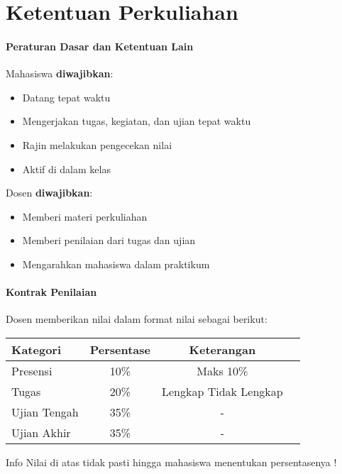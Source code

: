 

\section{Ketentuan Perkuliahan}
\begin{frame}{\insertsectionhead}
	\framesubtitle{Peraturan Dasar dan Ketentuan Lain}
	\justifying
	Mahasiswa \textbf{diwajibkan}:
	\begin{itemize}
		\item Datang tepat waktu
		\item Mengerjakan tugas, kegiatan, dan ujian tepat waktu
		\item Rajin melakukan pengecekan nilai
		\item Aktif di dalam kelas
	\end{itemize}
	Dosen \textbf{diwajibkan}:
	\begin{itemize}
		\item Memberi materi perkuliahan
		\item Memberi penilaian dari tugas dan ujian
		\item Mengarahkan mahasiswa dalam praktikum
	\end{itemize}
\end{frame}

\begin{frame}{\insertsectionhead}
	\framesubtitle{Kontrak Penilaian}
	\justifying
	Dosen memberikan nilai dalam format nilai sebagai berikut:
	 \begin{table}[H]
	 \centering
	 \begin{tabular}{@{} lccc @{}}
		    \toprule
		   \textbf{Kategori} & \textbf{Persentase} & \textbf{Keterangan} \\
		    \midrule
		    Presensi  & 10\% & Maks 10\% \\
		    Tugas  & 20\% & Lengkap \> Tidak Lengkap \\
		    Ujian Tengah   & 35\% & - \\
		    Ujian Akhir   & 35\% & - \\
		    \bottomrule
		  \end{tabular}
	\end{table}
	\begin{block}{Info}
		Nilai di atas tidak pasti hingga mahasiswa menentukan persentasenya !
	\end{block}
\end{frame}

